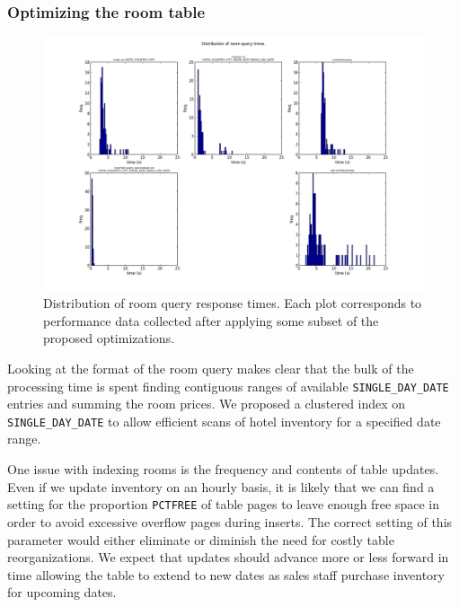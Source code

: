 \documentclass[letterpaper]{article}%
\begin{document}
\subsubsection{Optimizing the room table}

\begin{figure}[h!]
  \centering
  \includegraphics[width=\textwidth]{../ReserveWithUsApp/benchmark_data/1.png}
  \caption{Distribution of room query response times. Each plot corresponds to
    performance data collected after applying some subset of the proposed
    optimizations.}
  \label{fig:roomqueries}
\end{figure}

Looking at the format of the room query makes clear that the bulk of the
processing time is spent finding contiguous ranges of available
\texttt{SINGLE\_DAY\_DATE} entries and summing the room prices. We proposed a
clustered index on \texttt{SINGLE\_DAY\_DATE} to allow efficient scans of hotel
inventory for a specified date range.

One issue with indexing rooms is the frequency and contents of table updates.
Even if we update inventory on an hourly basis, it is likely that we can find a
setting for the proportion \texttt{PCTFREE} of table pages to leave enough free
space in order to avoid excessive overflow pages during inserts. The correct
setting of this parameter would either eliminate or diminish the need for
costly table reorganizations. We expect that updates should advance more or
less forward in time allowing the table to extend to new dates as sales staff
purchase inventory for upcoming dates.
\end{document}
